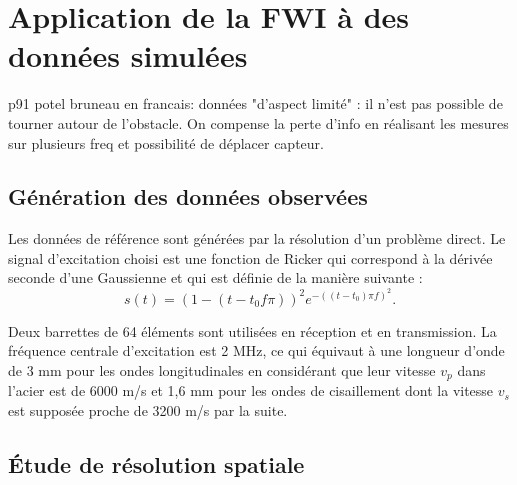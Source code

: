 \chapter{Application de la FWI à des données simulées \label{applications}}


p91 potel bruneau en francais: données "d'aspect limité" : il n'est pas possible de tourner autour de l'obstacle. On compense la perte d'info en réalisant les mesures sur plusieurs freq et possibilité de déplacer capteur.

\section{Génération des données observées}

Les données de référence sont générées par la résolution d'un problème direct.
Le signal d'excitation choisi est une fonction de Ricker qui correspond à la dérivée seconde d'une Gaussienne et qui est définie de la manière suivante : 
\begin{equation}
	s(t)=(1-(t-t_{0}f\pi))^2e^{-((t-t_{0})\pi f)^2}\text{.}
\end{equation}

Deux barrettes de 64 éléments sont utilisées en réception et en transmission. La fréquence centrale d'excitation est 2 MHz, ce qui équivaut à une longueur d'onde de 3 mm pour les ondes longitudinales en considérant que leur vitesse $v_{p}$ dans l'acier est de 6000 m/s et 1,6 mm pour les ondes de cisaillement dont la vitesse $v_{s}$ est supposée proche de 3200 m/s par la suite.





\section{Étude de résolution spatiale \label{app:section_reso}}

